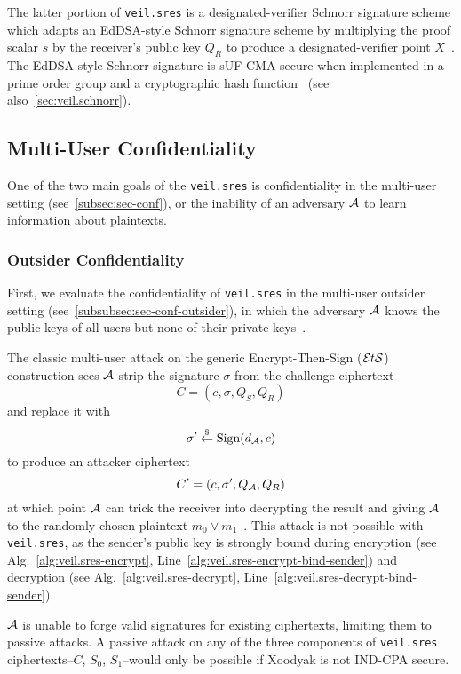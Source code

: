 The latter portion of \texttt{veil.sres} is a designated-verifier Schnorr signature scheme which adapts an EdDSA-style
Schnorr signature scheme by multiplying the proof scalar $s$ by the receiver's public key $Q_R$ to produce a
designated-verifier point $X$~\cite{steinfeld2004}.
The EdDSA-style Schnorr signature is sUF-CMA secure when implemented in a prime order
group and a cryptographic hash function~\cite{brendel2021, chalkias2020, pointcheval2000, neven2009}
(see also~\ref{sec:veil.schnorr}).

\subsection{Multi-User Confidentiality}\label{subsec:veil.sres-conf}

One of the two main goals of the \texttt{veil.sres} is confidentiality in the multi-user setting
(see~\ref{subsec:sec-conf}), or the inability of an adversary $\mathcal{A}$ to learn information about plaintexts.

\subsubsection{Outsider Confidentiality}

First, we evaluate the confidentiality of \texttt{veil.sres} in the multi-user outsider setting
(see~\ref{subsubsec:sec-conf-outsider}), in which the adversary $\mathcal{A}$ knows the public keys of all users but none
of their private keys~\cite[p. 44]{baek2010}.

The classic multi-user attack on the generic Encrypt-Then-Sign ($\mathcal{E}t\mathcal{S}$) construction sees $\mathcal{A}$ strip the
signature $\sigma$ from the challenge ciphertext
\[
    C=(c,\sigma,Q_S,Q_R)
\]
and replace it with
\[
    \sigma' \stackrel{\$}{\gets} \text{Sign}(d_{\mathcal{A}},c)
\]
to produce an attacker ciphertext
\[
    C'=(c,\sigma',Q_{\mathcal{A}},Q_R)
\]
at which point $\mathcal{A}$ can trick the receiver into decrypting the result and giving $\mathcal{A}$ to the
randomly-chosen plaintext $m_0 \lor m_1$~\cite[p. 40]{an2010}.
This attack is not possible with \texttt{veil.sres}, as the sender's public key is strongly bound during
encryption (see Alg.~\ref{alg:veil.sres-encrypt}, Line~\ref{alg:veil.sres-encrypt-bind-sender}) and decryption
(see Alg.~\ref{alg:veil.sres-decrypt}, Line~\ref{alg:veil.sres-decrypt-bind-sender}).

$\mathcal{A}$ is unable to forge valid signatures for existing ciphertexts, limiting them to passive attacks.
A passive attack on any of the three components of \texttt{veil.sres} ciphertexts--$C$, $S_0$, $S_1$--would only be
possible if Xoodyak is not IND-CPA secure.

